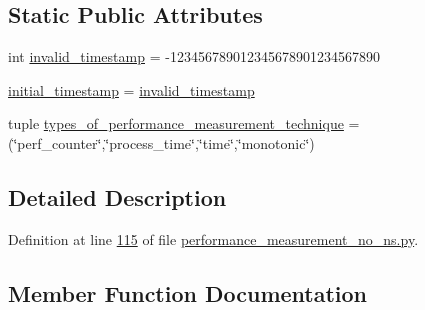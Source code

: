 \subsection*{Static Public Attributes}
\begin{DoxyCompactItemize}
\item 
int \hyperlink{classutilities_1_1timing__measurements_1_1performance__measurement__no__ns_1_1execution__time__measurement_ac0b6b9477824b6d0b0e1348864d55566}{invalid\+\_\+timestamp} = -\/123456789012345678901234567890
\item 
\hyperlink{classutilities_1_1timing__measurements_1_1performance__measurement__no__ns_1_1execution__time__measurement_a75ac358ee6e04eba517fd6dd429c99a1}{initial\+\_\+timestamp} = \hyperlink{classutilities_1_1timing__measurements_1_1performance__measurement__no__ns_1_1execution__time__measurement_ac0b6b9477824b6d0b0e1348864d55566}{invalid\+\_\+timestamp}
\item 
tuple \hyperlink{classutilities_1_1timing__measurements_1_1performance__measurement__no__ns_1_1execution__time__measurement_aa73046ac445a5731739e52ae5034c4a1}{types\+\_\+of\+\_\+performance\+\_\+measurement\+\_\+technique} = (\char`\"{}perf\+\_\+counter\char`\"{},\char`\"{}process\+\_\+time\char`\"{},\char`\"{}time\char`\"{},\char`\"{}monotonic\char`\"{})
\end{DoxyCompactItemize}


\subsection{Detailed Description}


Definition at line \hyperlink{performance__measurement__no__ns_8py_source_l00115}{115} of file \hyperlink{performance__measurement__no__ns_8py_source}{performance\+\_\+measurement\+\_\+no\+\_\+ns.\+py}.



\subsection{Member Function Documentation}
\hypertarget{classutilities_1_1timing__measurements_1_1performance__measurement__no__ns_1_1execution__time__measurement_a75eea39203f4d9b779977f9203f6d745}{}
